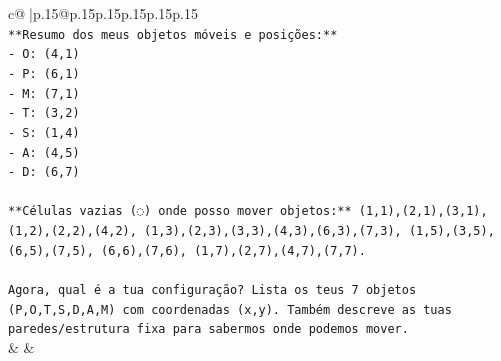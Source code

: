 \documentclass{article}
\begin{document}
{\begin{supertabular}{c@{$\;$}|p{.15\linewidth}@{}p{.15\linewidth}p{.15\linewidth}p{.15\linewidth}p{.15\linewidth}p{.15\linewidth}}
{{{\\ 
\texttt{**Resumo dos meus objetos móveis e posições:**} \\
\texttt{{-} O: (4,1)} \\
\texttt{{-} P: (6,1)} \\
\texttt{{-} M: (7,1)} \\
\texttt{{-} T: (3,2)} \\
\texttt{{-} S: (1,4)} \\
\texttt{{-} A: (4,5)} \\
\texttt{{-} D: (6,7)} \\
\\ 
\texttt{**Células vazias (◌) onde posso mover objetos:** (1,1),(2,1),(3,1), (1,2),(2,2),(4,2), (1,3),(2,3),(3,3),(4,3),(6,3),(7,3), (1,5),(3,5),(6,5),(7,5), (6,6),(7,6), (1,7),(2,7),(4,7),(7,7).} \\
\\ 
\texttt{Agora, qual é a tua configuração? Lista os teus 7 objetos (P,O,T,S,D,A,M) com coordenadas (x,y). Também descreve as tuas paredes/estrutura fixa para sabermos onde podemos mover.} \\
            }
        }
    }
    & & \\ \\


\end{supertabular}}
\end{document}
